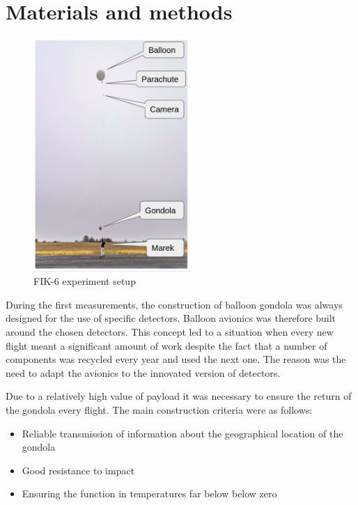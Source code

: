 \documentclass{Rpd}
\begin{document}
\section{Materials and methods}

\begin{center}
\begin{figure}%
	\centerline{\includegraphics[width=60mm]{img/FIK-6_experiment_setup.png}}
	\caption{FIK-6 experiment setup \label{FIK-6_setup}}
\end{figure}
\end{center}

During the first measurements, the construction of balloon gondola was always designed for the use of specific detectors. Balloon avionics was therefore built around the chosen detectors.
This concept led to a situation when every new flight meant a significant amount of work despite the fact that a number of components was recycled every year and used the next one. The reason was the need to adapt the avionics to the innovated version of detectors.

Due to a relatively high value of payload it was necessary to ensure the return of the gondola every flight. The main construction criteria were as follows:


\begin{itemize}
\item Reliable transmission of information about the geographical location of the gondola
\item Good resistance to impact
\item Ensuring the function in temperatures far below below zero
\end{itemize}
\end{document}
